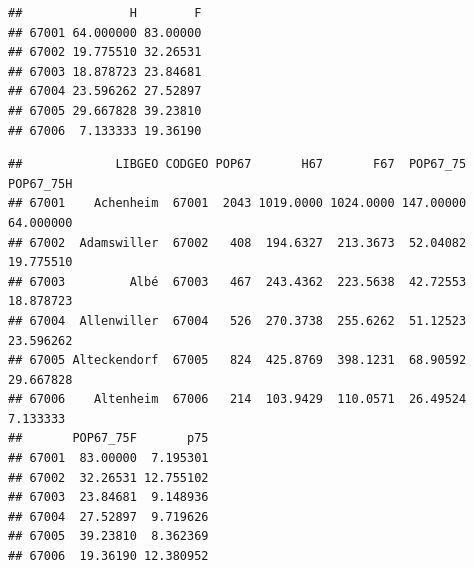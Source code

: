 \documentclass[]{article}
\newenvironment{Shaded}{\begin{snugshade}}{\end{snugshade}}
\newcommand{\KeywordTok}[1]{\textcolor[rgb]{0.13,0.29,0.53}{\textbf{{#1}}}}
\newcommand{\DecValTok}[1]{\textcolor[rgb]{0.00,0.00,0.81}{{#1}}}
\newcommand{\FloatTok}[1]{\textcolor[rgb]{0.00,0.00,0.81}{{#1}}}
\newcommand{\StringTok}[1]{\textcolor[rgb]{0.31,0.60,0.02}{{#1}}}
\newcommand{\CommentTok}[1]{\textcolor[rgb]{0.56,0.35,0.01}{\textit{{#1}}}}
\newcommand{\NormalTok}[1]{{#1}}
\begin{document}
\begin{verbatim}
##               H        F
## 67001 64.000000 83.00000
## 67002 19.775510 32.26531
## 67003 18.878723 23.84681
## 67004 23.596262 27.52897
## 67005 29.667828 39.23810
## 67006  7.133333 19.36190
\end{verbatim}

\begin{Shaded}
\end{Shaded}

\begin{verbatim}
##             LIBGEO CODGEO POP67       H67       F67  POP67_75 POP67_75H
## 67001    Achenheim  67001  2043 1019.0000 1024.0000 147.00000 64.000000
## 67002  Adamswiller  67002   408  194.6327  213.3673  52.04082 19.775510
## 67003         Albé  67003   467  243.4362  223.5638  42.72553 18.878723
## 67004  Allenwiller  67004   526  270.3738  255.6262  51.12523 23.596262
## 67005 Alteckendorf  67005   824  425.8769  398.1231  68.90592 29.667828
## 67006    Altenheim  67006   214  103.9429  110.0571  26.49524  7.133333
##       POP67_75F       p75
## 67001  83.00000  7.195301
## 67002  32.26531 12.755102
## 67003  23.84681  9.148936
## 67004  27.52897  9.719626
## 67005  39.23810  8.362369
## 67006  19.36190 12.380952
\end{verbatim}
\end{document}
